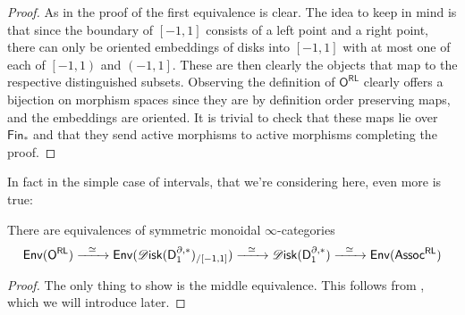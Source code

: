 \documentclass[../text]{subfiles}
\begin{document}
\begin{proof}
    As in the proof of  the first equivalence is clear. The idea to keep in mind is that since the boundary of $[-1,1]$ consists of a left point and a right point, there can only be oriented embeddings of disks into $[-1,1]$ with at most one of each of $\left[-1,1 \right)$ and $\left( -1, 1 \right]$. These are then clearly the objects that map to the respective distinguished subsets. Observing the definition of $\mathsf{O^{RL}}$ clearly offers a bijection on morphism spaces since they are by definition order preserving maps, and the embeddings are oriented. It is trivial to check that these maps lie over $\mathsf{Fin}_*$ and that they send active morphisms to active morphisms completing the proof.
\end{proof}

In fact in the simple case of intervals, that we're considering here, even more is true:

\begin{proposition}\label{prop:env_ORL=env_assocRL}
    There are equivalences of symmetric monoidal $\infty$-categories
    \begin{equation}
        \mathsf{Env}(\mathsf{O^{RL}}) \xrightarrow{\ \ \simeq \ \ } \mathsf{Env}(\disk (\mathsf{D}_1^{\partial, *})_{/[-1,1]}) \xrightarrow{\ \ \simeq \ \ } \disk (\mathsf{D}_1^{\partial, *}) \xrightarrow{\ \ \simeq \ \ } \mathsf{Env} (\mathsf{Assoc^{RL}})
    \end{equation}
\end{proposition}

\begin{proof}
    The only thing to show is the middle equivalence. This follows from , which we will introduce later. 
\end{proof}
\end{document}
